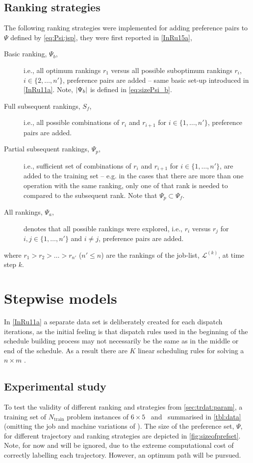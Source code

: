 \subsection{Ranking strategies}\label{sec:trdat:param:ranks}
The following ranking strategies were implemented for adding preference pairs 
to $\Psi$ defined by \cref{eq:Psi:jsp}, they were first reported in 
\cref{InRu15a},
\begin{description}
    \item[Basic ranking, $\Psi_b$,] i.e., all optimum rankings $r_1$ versus all 
    possible suboptimum rankings $r_i$, $i\in\{2,\ldots,n'\}$, preference pairs 
    are added -- same basic set-up introduced in \cref{InRu11a}. Note, 
    $\lvert\Psi_b\rvert$ is defined in \cref{eq:sizePsi_b}.
    \item[Full subsequent rankings, $S_f$,] i.e., all possible combinations of 
    $r_i$ and $r_{i+1}$ for $i\in\{1,\ldots,n'\}$, preference pairs are added.
    \item[Partial subsequent rankings, $\Psi_p$,] i.e., sufficient set of 
    combinations of $r_i$ and $r_{i+1}$ for $i\in\{1,\ldots,n'\}$, are added to 
    the training set -- e.g. in the cases that there are more than one 
    operation with the same ranking, only one of that rank is needed to 
    compared to the subsequent rank. Note that $\Psi_p\subset \Psi_f$.
    \item[All rankings, $\Psi_a$,] denotes that all possible rankings were 
    explored, i.e.,
    $r_i$ versus $r_j$ for $i,j\in\{1,\ldots,n'\}$ and $i\neq j$, preference 
    pairs are added.
\end{description}
where $r_1>r_2>\ldots>r_{n'}$ ($n'\leq n$) are the rankings of the job-list, 
$\mathcal{L}^{(k)}$, at time step $k$.


\section{Stepwise models}
In \cref{InRu11a} a separate data set is deliberately created for each dispatch 
iterations, as the initial feeling is that dispatch rules used in the beginning 
of the schedule building process may not necessarily be the same as in the 
middle or end of the schedule. As a result there are $K$ linear scheduling 
rules for solving a $n \times m$ \jsp. 


\subsection{Experimental study}\label{sec:sec:trdat:param:expr}
To test the validity of different ranking and strategies from 
\cref{sec:trdat:param}, a training set of $N_{\text{train}}$ problem instances 
of $6\times5$ \jsp\ and \fsp\ summarised in \cref{tbl:data} (omitting the job 
and machine variations of \jsp). The size of the preference set, $\Psi$, for 
different trajectory and ranking strategies are depicted in 
\cref{fig:sizeofprefset}. Note, for now  and  will 
be ignored, due to the extreme computational cost of correctly labelling each 
trajectory. However, an optimum path will be pursued.

